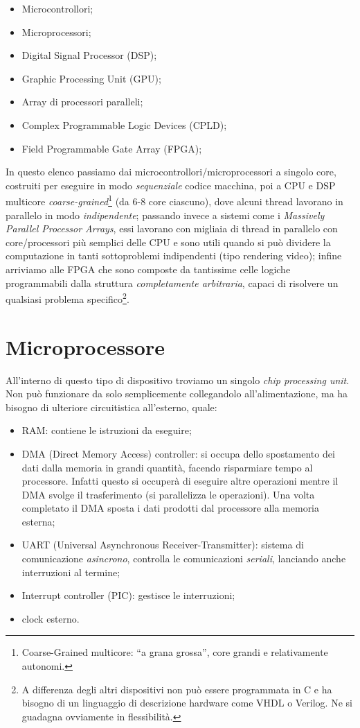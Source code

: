 \documentclass[
]{book}
\providecommand{\tightlist}{%
  \setlength{\itemsep}{0pt}\setlength{\parskip}{0pt}}
\begin{document}
\begin{itemize}
\tightlist
\item
  Microcontrollori;
\item
  Microprocessori;
\item
  Digital Signal Processor (DSP);
\item
  Graphic Processing Unit (GPU);
\item
  Array di processori paralleli;
\item
  Complex Programmable Logic Devices (CPLD);
\item
  Field Programmable Gate Array (FPGA);
\end{itemize}

In questo elenco passiamo dai microcontrollori/microprocessori a singolo
core, costruiti per eseguire in modo \emph{sequenziale} codice macchina,
poi a CPU e DSP multicore \emph{coarse-grained}\footnote{Coarse-Grained
  multicore: ``a grana grossa'', core grandi e relativamente autonomi.}
(da 6-8 core ciascuno), dove alcuni thread lavorano in parallelo in modo
\emph{indipendente}; passando invece a sistemi come i \emph{Massively
Parallel Processor Arrays}, essi lavorano con migliaia di thread in
parallelo con core/processori più semplici delle CPU e sono utili quando
si può dividere la computazione in tanti sottoproblemi indipendenti
(tipo rendering video); infine arriviamo alle FPGA che sono composte da
tantissime celle logiche programmabili dalla struttura
\emph{completamente arbitraria}, capaci di risolvere un qualsiasi
problema specifico\footnote{A differenza degli altri dispositivi non può
  essere programmata in C e ha bisogno di un linguaggio di descrizione
  hardware come VHDL o Verilog. Ne si guadagna ovviamente in
  flessibilità.}.

\section{Microprocessore}\label{microprocessore}

All'interno di questo tipo di dispositivo troviamo un singolo \emph{chip
processing unit}. Non può funzionare da solo semplicemente collegandolo
all'alimentazione, ma ha bisogno di ulteriore circuitistica all'esterno,
quale:

\begin{itemize}
\tightlist
\item
  RAM: contiene le istruzioni da eseguire;
\item
  DMA (Direct Memory Access) controller: si occupa dello spostamento dei
  dati dalla memoria in grandi quantità, facendo risparmiare tempo al
  processore. Infatti questo si occuperà di eseguire altre operazioni
  mentre il DMA svolge il trasferimento (si parallelizza le operazioni).
  Una volta completato il DMA sposta i dati prodotti dal processore alla
  memoria esterna;
\item
  UART (Universal Asynchronous Receiver-Transmitter): sistema di
  comunicazione \emph{asincrono}, controlla le comunicazioni
  \emph{seriali}, lanciando anche interruzioni al termine;
\item
  Interrupt controller (PIC): gestisce le interruzioni;
\item
  clock esterno.
\end{itemize}
\end{document}

